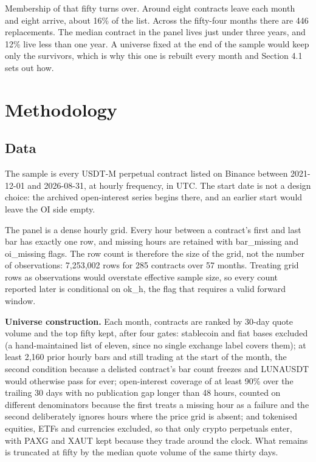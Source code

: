 \documentclass[11pt,a4paper]{article}
\begin{document}
Membership of that fifty turns over. Around eight contracts leave each month and eight arrive, about 16\% of the list. Across the fifty-four months there are 446 replacements. The median contract in the panel lives just under three years, and 12\% live less than one year. A universe fixed at the end of the sample would keep only the survivors, which is why this one is rebuilt every month and Section 4.1 sets out how.

\bigskip

\section{Methodology}

\subsection{Data}

The sample is every USDT-M perpetual contract listed on Binance between 2021-12-01 and 2026-08-31, at hourly frequency, in UTC. The start date is not a design choice: the archived open-interest series begins there, and an earlier start would leave the OI side empty.

The panel is a dense hourly grid. Every hour between a contract's first and last bar has exactly one row, and missing hours are retained with bar\_missing and oi\_missing flags. The row count is therefore the size of the grid, not the number of observations: 7,253,002 rows for 285 contracts over 57 months. Treating grid rows as observations would overstate effective sample size, so every count reported later is conditional on ok\_h, the flag that requires a valid forward window.

\textbf{Universe construction.} Each month, contracts are ranked by 30-day quote volume and the top fifty kept, after four gates: stablecoin and fiat bases excluded (a hand-maintained list of eleven, since no single exchange label covers them); at least 2,160 prior hourly bars and still trading at the start of the month, the second condition because a delisted contract's bar count freezes and LUNAUSDT would otherwise pass for ever; open-interest coverage of at least 90\% over the trailing 30 days with no publication gap longer than 48 hours, counted on different denominators because the first treats a missing hour as a failure and the second deliberately ignores hours where the price grid is absent; and tokenised equities, ETFs and currencies excluded, so that only crypto perpetuals enter, with PAXG and XAUT kept because they trade around the clock. What remains is truncated at fifty by the median quote volume of the same thirty days.
\end{document}
